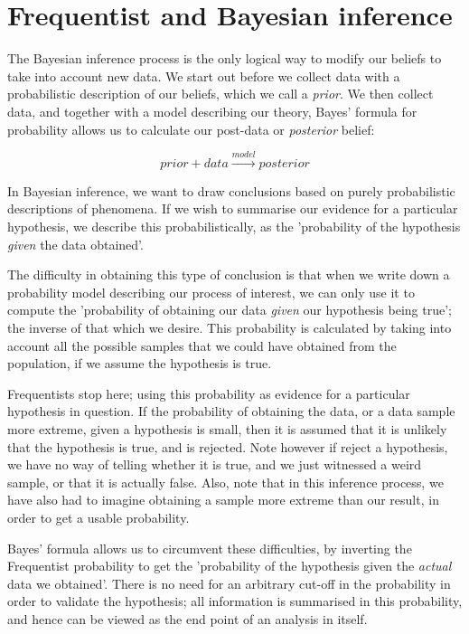 \documentclass[11pt,fullpage]{book}
\begin{document}
\section{Frequentist and Bayesian inference}
The Bayesian inference process is the only logical way to modify our beliefs to take into account new data. We start out before we collect data with a probabilistic description of our beliefs, which we call a \textit{prior}. We then collect data, and together with a model describing our theory, Bayes' formula for probability allows us to calculate our post-data or \textit{posterior} belief:

\begin{equation}
prior + data \xrightarrow{model} posterior
\end{equation}

In Bayesian inference, we want to draw conclusions based on purely probabilistic descriptions of phenomena. If we wish to summarise our evidence for a particular hypothesis, we describe this probabilistically, as the 'probability of the hypothesis \textit{given} the data obtained'. 

The difficulty in obtaining this type of conclusion is that when we write down a probability model describing our process of interest, we can only use it to compute the 'probability of obtaining our data \textit{given} our hypothesis being true'; the inverse of that which we desire. This probability is calculated by taking into account all the possible samples that we could have obtained from the population, if we assume the hypothesis is true. 

Frequentists stop here; using this probability as evidence for a particular hypothesis in question. If the probability of obtaining the data, or a data sample more extreme, given a hypothesis is small, then it is assumed that it is unlikely that the hypothesis is true, and is rejected. Note however if reject a hypothesis, we have no way of telling whether it is true, and we just witnessed a weird sample, or that it is actually false. Also, note that in this inference process, we have also had to imagine obtaining a sample more extreme than our result, in order to get a usable probability. 

Bayes' formula allows us to circumvent these difficulties, by inverting the Frequentist probability to get the 'probability of the hypothesis given the \textit{actual} data we obtained'. There is no need for an arbitrary cut-off in the probability in order to validate the hypothesis; all information is summarised in this probability, and hence can be viewed as the end point of an analysis in itself.
\end{document}
